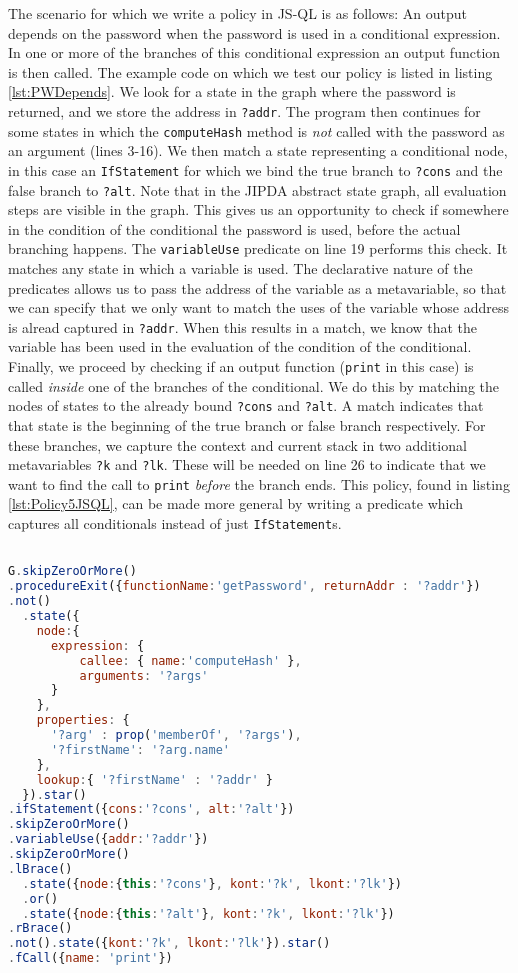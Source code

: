 The scenario for which we write a policy in JS-QL is as follows: An output depends on the password when the password is used in a conditional expression. In one or more of the branches of this conditional expression an output function is then called. The example code on which we test our policy is listed in listing \ref{lst:PWDepends}. We look for a state in the graph where the password is returned, and we store the address in \texttt{?addr}. The program then continues for some states in which the \texttt{computeHash} method is \textit{not} called with the password as an argument (lines 3-16). We then match a state representing a conditional node, in this case an \texttt{IfStatement} for which we bind the true branch to \texttt{?cons} and the false branch to \texttt{?alt}. Note that in the JIPDA abstract state graph, all evaluation steps are visible in the graph. This gives us an opportunity to check if somewhere in the condition of the conditional the password is used, before the actual branching happens. The \texttt{variableUse} predicate on line 19 performs this check. It matches any state in which a variable is used. The declarative nature of the predicates allows us to pass the address of the variable as a metavariable, so that we can specify that we only want to match the uses of the variable whose address is alread captured in \texttt{?addr}. When this results in a match, we know that the variable has been used in the evaluation of the condition of the conditional. Finally, we proceed by checking if an output function (\texttt{print} in this case) is called \textit{inside} one of the branches of the conditional. We do this by matching the nodes of states to the already bound \texttt{?cons} and \texttt{?alt}. A match indicates that that state is the beginning of the true branch or false branch respectively. For these branches, we capture the context and current stack in two additional metavariables \texttt{?k} and \texttt{?lk}. These will be needed on line 26 to indicate that we want to find the call to \texttt{print} \textit{before} the branch ends. This policy, found in listing \ref{lst:Policy5JSQL}, can be made more general by writing a predicate which captures all conditionals instead of just \texttt{IfStatement}s.

\begin{lstlisting}[label={lst:Policy5JSQL},language=JavaScript,caption=Policy 5 in JSQL,mathescape=true]  % float=t?

G.skipZeroOrMore()
.procedureExit({functionName:'getPassword', returnAddr : '?addr'})
.not()
  .state({
    node:{  
      expression: {
          callee: { name:'computeHash' },
          arguments: '?args'
      }
    },
    properties: {
      '?arg' : prop('memberOf', '?args'),
      '?firstName': '?arg.name'
    },
    lookup:{ '?firstName' : '?addr' }
  }).star()
.ifStatement({cons:'?cons', alt:'?alt'})
.skipZeroOrMore()
.variableUse({addr:'?addr'})
.skipZeroOrMore()
.lBrace()
  .state({node:{this:'?cons'}, kont:'?k', lkont:'?lk'})
  .or()
  .state({node:{this:'?alt'}, kont:'?k', lkont:'?lk'})
.rBrace()
.not().state({kont:'?k', lkont:'?lk'}).star()
.fCall({name: 'print'})
\end{lstlisting}
 
